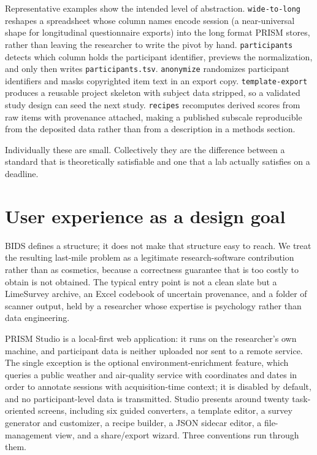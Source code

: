 \documentclass[10pt]{article}
\begin{document}
Representative examples show the intended level of abstraction.
\texttt{wide-to-long} reshapes a spreadsheet whose column names encode
session (a near-universal shape for longitudinal questionnaire exports) into
the long format PRISM stores, rather than leaving the researcher to write
the pivot by hand. \texttt{participants} detects which column holds the
participant identifier, previews the normalization, and only then writes
\texttt{participants.tsv}. \texttt{anonymize} randomizes participant
identifiers and masks copyrighted item text in an export copy.
\texttt{template-export} produces a reusable project skeleton with subject
data stripped, so a validated study design can seed the next study.
\texttt{recipes} recomputes derived scores from raw items with provenance
attached, making a published subscale reproducible from the deposited data
rather than from a description in a methods section.

Individually these are small. Collectively they are the difference between a
standard that is theoretically satisfiable and one that a lab actually
satisfies on a deadline.

\section{User experience as a design goal}
\label{sec:ux}

BIDS defines a structure; it does not make that structure easy to reach.
We treat the resulting last-mile problem as a legitimate research-software
contribution rather than as cosmetics, because a correctness guarantee that
is too costly to obtain is not obtained. The typical entry point is not a
clean slate but a LimeSurvey archive, an Excel codebook of uncertain
provenance, and a folder of scanner output, held by a researcher whose
expertise is psychology rather than data engineering.

PRISM Studio is a local-first web application: it runs on the researcher's
own machine, and participant data is neither uploaded nor sent to a remote
service. The single exception is the optional environment-enrichment feature,
which queries a public weather and air-quality service with coordinates and
dates in order to annotate sessions with acquisition-time context; it is
disabled by default, and no participant-level data is transmitted. Studio
presents around twenty task-oriented screens, including six guided
converters, a template editor, a survey generator and customizer, a recipe
builder, a JSON sidecar editor, a file-management view, and a share/export
wizard. Three conventions run through them.
\end{document}
